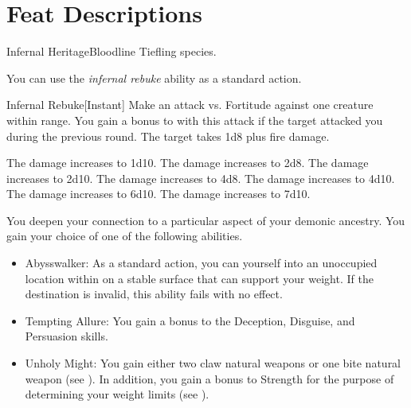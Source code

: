     \section{Feat Descriptions}

    \begin{feat}{Infernal Heritage}{Bloodline}
        \featpre Tiefling species.

         You can use the \textit{infernal rebuke} ability as a standard action.
        \begin{freeability}{Infernal Rebuke}[Instant]
            \rankline
            Make an attack vs. Fortitude against one creature within \rngshort range.
            You gain a  bonus to  with this attack if the target attacked you during the previous round.
            \hit The target takes 1d8 plus  fire damage.

            \rankline
             The damage increases to 1d10.
             The damage increases to 2d8.
             The damage increases to 2d10.
             The damage increases to 4d8.
             The damage increases to 4d10.
             The damage increases to 6d10.
             The damage increases to 7d10.
        \end{freeability}

         You deepen your connection to a particular aspect of your demonic ancestry.
        You gain your choice of one of the following abilities.
        \begin{itemize}
            \item Abysswalker: As a standard action, you can  yourself into an unoccupied location within \medrange on a stable surface that can support your weight.
            If the destination is invalid, this ability fails with no effect.
            \item Tempting Allure: You gain a  bonus to the Deception, Disguise, and Persuasion skills.
            \item Unholy Might: You gain either two claw natural weapons or one bite natural weapon (see ).
                In addition, you gain a  bonus to Strength for the purpose of determining your weight limits (see ).
        \end{itemize}


\end{feat}
